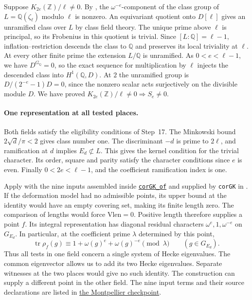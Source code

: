 \documentclass[11pt,a4paper]{article}
\newcommand{\Q}{\mathbb Q}
\newcommand{\Z}{\mathbb Z}
\newcommand{\tr}{\operatorname{tr}}
\newcommand{\scl}{https://github.com/CocoSgt/riemann-hypothesis-lean/blob/7cbf7a0c32fca1badf05931879a37c3f8a2b03b4/src/Development/AutomorphicArithmetic/AutomorphicVarieties/SmallClassNumbers}
\newcommand{\kt}{https://github.com/KokunoYumeto/grothendieck-montpellier-archive/blob/edb183a9af46cb9568e0d3caf2248e98b491e6fb/raw/research_returns/KTOWER_checkpoint_11_20261122T0001Z_unzipped/KTOWER.tex}
\begin{document}
Suppose \(K_{2e}(\Z)/\ell\ne0\). By \cite[Thm.~5.1]{jkpsz}, the
\(\omega^{-e}\)-component of the class group of \(L=\Q(\zeta_\ell)\)
modulo \(\ell\) is nonzero. An equivariant quotient onto \(D[\ell]\)
gives an unramified class over \(L\) by class field theory.
The unique prime above \(\ell\) is principal, so its Frobenius in
this quotient is trivial. Since \([L:\Q]=\ell-1\), inflation--restriction
descends the class to \(\Q\) and preserves its local triviality at \(\ell\).
At every other finite prime the extension \(L/\Q\) is unramified.
As \(0<e<\ell-1\), we have \(D^{G_\Q}=0\), so the exact sequence for
multiplication by \(\ell\) injects the descended class into \(H^1(\Q,D)\).
At \(2\) the unramified group is \(D/(2^{-e}-1)D=0\), since the nonzero
scalar acts surjectively on the divisible module \(D\).
We have proved \(K_{2e}(\Z)/\ell\ne0\Rightarrow S_e\ne0\).

\paragraph{One representation at all tested places.}
Both fields satisfy the eligibility conditions of Step~17.
The Minkowski bound \(2\sqrt d/\pi<2\) gives class number one.
The discriminant \(-d\) is prime to \(2\ell\), and ramification at \(d\)
implies \(E_d\not\subset L\). This gives the kernel condition for the
trivial character. Its order, square and parity satisfy the character
conditions since \(e\) is even. Finally \(0<2e<\ell-1\), and the
coefficient ramification index is one.

Apply \cite[K17-S17-JOINT]{ktower} with the nine inputs assembled inside
\href{\scl/CorGKOf.lean\#L10-L27}{\texttt{corGK\_of}} and supplied
by \texttt{corGK} in \cite{alpoge}. If the deformation model had no
admissible points, its upper bound at the identity would have an empty
covering set, making its finite length zero. The comparison of lengths
would force \(\mathrm{Vlen}=0\). Positive length therefore supplies a
point \(f\). Its integral representation has diagonal residual characters
\(\omega^e,1,\omega^{-e}\) on \(G_{E_d}\). In particular, at the
coefficient prime \(\lambda\) determined by this point,
\[
  \tr\rho_f(g)\equiv 1+\omega(g)^e+\omega(g)^{-e}\pmod{\lambda}
  \qquad(g\in G_{E_d}).
\]
Thus all tests in one field concern a single system of Hecke eigenvalues.
The common eigenvector allows us to add its two Hecke eigenvalues. Separate witnesses at the two places would give no such identity. The construction can supply a different point in the other field. The nine input terms and their source declarations are listed in \href{\kt\#L154-L218}{the Montpellier checkpoint}.
\end{document}
